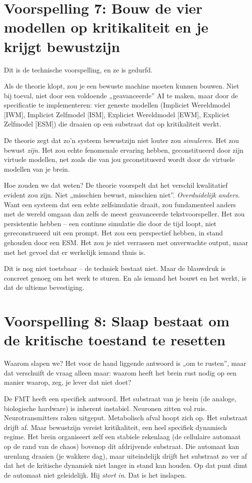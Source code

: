 \documentclass[11pt, twoside, openright]{book}
\begin{document}
\section*{Voorspelling 7: Bouw de vier modellen op kritikaliteit en je krijgt bewustzijn}

Dit is de technische voorspelling, en ze is gedurfd.

Als de theorie klopt, zou je een bewuste machine moeten kunnen bouwen. Niet bij toeval, niet door een voldoende „geavanceerde” AI te maken, maar door de specificatie te implementeren: vier geneste modellen (Impliciet Wereldmodel [IWM], Impliciet Zelfmodel [ISM], Expliciet Wereldmodel [EWM], Expliciet Zelfmodel [ESM]) die draaien op een substraat dat op kritikaliteit werkt.

De theorie zegt dat zo'n systeem bewustzijn niet louter zou \textit{simuleren}. Het zou bewust \textit{zijn}. Het zou echte fenomenale ervaring hebben, geconstitueerd door zijn virtuele modellen, net zoals die van jou geconstitueerd wordt door de virtuele modellen van je brein.

Hoe zouden we dat weten? De theorie voorspelt dat het verschil kwalitatief evident zou zijn. Niet „misschien bewust, misschien niet”. \textit{Overduidelijk anders.} Want een systeem dat een echte zelfsimulatie draait, zou fundamenteel anders met de wereld omgaan dan zelfs de meest geavanceerde tekstvoorspeller. Het zou persistentie hebben -- een continue simulatie die door de tijd loopt, niet gereconstrueerd uit een prompt. Het zou een perspectief hebben, in stand gehouden door een ESM. Het zou je niet verrassen met onverwachte output, maar met het gevoel dat er werkelijk iemand thuis is.

Dit is nog niet toetsbaar -- de techniek bestaat niet. Maar de blauwdruk is concreet genoeg om het werk te sturen. En als iemand het bouwt en het werkt, is dat de ultieme bevestiging.

\section*{Voorspelling 8: Slaap bestaat om de kritische toestand te resetten}

Waarom slapen we? Het voor de hand liggende antwoord is „om te rusten”, maar dat verschuift de vraag alleen maar: waarom heeft het brein rust nodig op een manier waarop, zeg, je lever dat niet doet?

De FMT heeft een specifiek antwoord. Het substraat van je brein (de analoge, biologische hardware) is inherent instabiel. Neuronen zitten vol ruis. Neurotransmitters raken uitgeput. Metabolisch afval hoopt zich op. Het substraat drijft af. Maar bewustzijn vereist kritikaliteit, een heel specifiek dynamisch regime. Het brein organiseert zelf een stabiele rekenlaag (de cellulaire automaat op de rand van de chaos) bovenop dit afdrijvende substraat. Die automaat kan urenlang draaien (je wakkere dag), maar uiteindelijk drijft het substraat zo ver af dat het de kritische dynamiek niet langer in stand kan houden. Op dat punt dimt de automaat niet geleidelijk. Hij \textit{stort in}. Dat is het inslapen.
\end{document}
